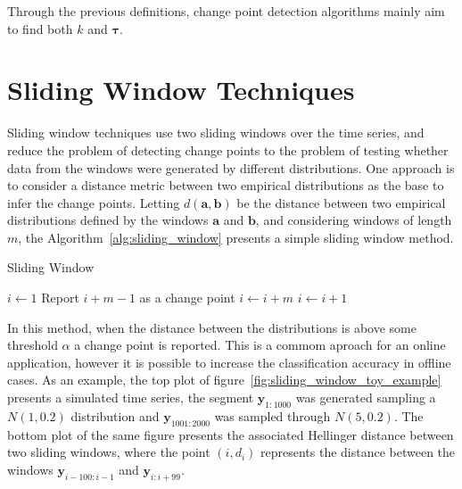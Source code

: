 Through the previous definitions, change point detection algorithms mainly aim to find both $k$ and $\boldsymbol \tau$.

\section{Sliding Window Techniques}

Sliding window techniques use two sliding windows over the time series, and reduce the problem of detecting change points to the problem of testing whether data from the windows were generated by different distributions. One approach is to consider a distance metric between two empirical distributions as the base to infer the change points. Letting $d(\mathbf{a}, \mathbf{b})$ be the distance between two empirical distributions defined by the windows $\mathbf{a}$ and $\mathbf{b}$, and considering windows of length $m$, the Algorithm~\ref{alg:sliding_window} presents a simple sliding window method.

\begin{algorithm}
    \caption{Sliding Window}
    \label{alg:sliding_window}
	\begin{algorithmic}[1]
		\State $i \gets 1$
                \State Report $i + m - 1$ as a change point
		        \State $i \gets i + m$
             \Else
		        \State $i \gets i + 1$
             \EndIf
        \EndWhile
	\end{algorithmic}
\end{algorithm}

In this method, when the distance between the distributions is above some threshold $\alpha$ a change point is reported. This is a commom aproach for an online application, however it is possible to increase the classification accuracy in offline cases. As an example, the top plot of figure~\ref{fig:sliding_window_toy_example} presents a simulated time series, the segment $\mathbf{y}_{1 : 1000}$ was generated sampling a $N(1, 0.2)$ distribution and $\mathbf{y}_{1001 : 2000}$ was sampled through $N(5, 0.2)$. The bottom plot of the same figure presents the associated Hellinger distance between two sliding windows, where the point $(i, d_{i})$ represents the distance between the windows $\mathbf{y}_{i - 100 : i - 1}$ and $\mathbf{y}_{i : i + 99}$.

